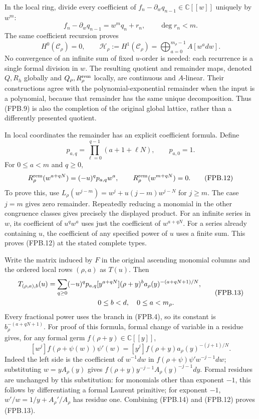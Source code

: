 In the local ring, divide every coefficient of
\(f_n-\partial_wq_{n-1}\in\mathbb{C}[[w]]\) uniquely by \(w^m\):
\[
 f_n-\partial_wq_{n-1}=w^m q_n+r_n,
 \qquad \deg r_n<m.
 \tag{FPB.10}\label{eq:fpb-local-division}
\]
The same coefficient recursion proves
\[
 H^0(\mathcal C_\rho)=0,
 \qquad \mathcal H_\rho:=H^1(\mathcal C_\rho)
       =\bigoplus_{a=0}^{m_\rho-1}A[w^a dw].
 \tag{FPB.11}\label{eq:fpb-local-remainder}
\]
No convergence of an infinite sum of fixed \(u\)-order is needed:
each recurrence is a single formal division in \(w\). The resulting
quotient and remainder maps, denoted \(Q,R_h\) globally and
\(Q_\rho,R_\rho^{\rm rem}\) locally, are continuous and \(A\)-linear.
Their constructions agree with the polynomial-exponential remainder
when the input is a polynomial, because that remainder has the same
unique decomposition. Thus (FPB.9) is also the completion of the
original global lattice, rather than a differently presented quotient.

In local coordinates the remainder has an explicit coefficient
formula. Define
\[
 p_{a,q}=\prod_{\ell=0}^{q-1}(a+1+\ell N),\qquad p_{a,0}=1.
\]
For \(0\le a<m\) and \(q\ge0\),
\[
 R_\rho^{\rm rem}(w^{a+qN})=(-u)^q p_{a,q}w^a,
 \qquad
 R_\rho^{\rm rem}(w^{m+qN})=0.
 \tag{FPB.12}\label{eq:fpb-monomial-remainder}
\]
To prove this, use
\(L_\rho(w^{j-m})=w^j+u(j-m)w^{j-N}\) for \(j\ge m\).
The case \(j=m\) gives zero remainder. Repeatedly reducing a monomial
in the other congruence classes gives precisely the displayed product.
For an infinite series in \(w\), its coefficient of \(u^q w^a\)
uses just the coefficient of \(w^{a+qN}\). For a series already
containing \(u\), the coefficient of any specified power of \(u\)
uses a finite sum. This proves (FPB.12) at the stated complete types.

Write the matrix induced by \(F\) in the original ascending monomial
columns and the ordered local rows \((\rho,a)\) as \(T(u)\). Then
\[
 \begin{split}
 T_{(\rho,a),b}(u)
 &=\sum_{q\ge0}(-u)^q p_{a,q}
   [y^{a+qN}](\rho+y)^b
       a_\rho(y)^{-(a+qN+1)/N},\\
 &\hspace{25mm}0\le b<d,\quad 0\le a<m_\rho.
 \end{split}
 \tag{FPB.13}\label{eq:fpb-T}
\]
Every fractional power uses the branch in (FPB.4), so its constant
is \(b_\rho^{-(a+qN+1)}\). For proof of this formula, formal
change of variable in a residue gives, for any formal germ
\(f(\rho+y)\in\mathbb{C}[[y]]\),
\[
 [w^j]f(\rho+\psi(w))\psi'(w)
   =[y^j]f(\rho+y)a_\rho(y)^{-(j+1)/N}.
 \tag{FPB.14}\label{eq:fpb-residue}
\]
Indeed the left side is the coefficient of \(w^{-1}dw\) in
\(f(\rho+\psi)\psi' w^{-j-1}dw\); substituting
\(w=yA_\rho(y)\) gives
\(f(\rho+y)y^{-j-1}A_\rho(y)^{-j-1}dy\). Formal residues are
unchanged by this substitution: for monomials other than exponent
\(-1\), this follows by differentiating a formal Laurent primitive;
for exponent \(-1\), \(w'/w=1/y+A_\rho'/A_\rho\) has residue one.
Combining (FPB.14) and (FPB.12) proves (FPB.13).

